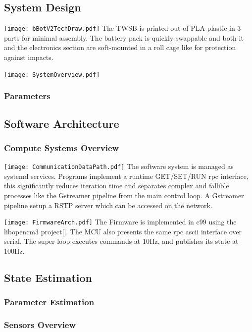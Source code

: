     \subsection{System Design}
        \texttt{[image: bBotV2TechDraw.pdf]}
        The TWSB is printed out of PLA plastic in 3 parts for minimal assembly.
        The battery pack is quickly swappable and both it and the electronics section 
        are soft-mounted in a roll cage like for protection against impacts. 
        
        \texttt{[image: SystemOverview.pdf]}

        \subsubsection{Parameters}

        \subsection{Software Architecture}
        \subsubsection{Compute Systems Overview }
        \texttt{[image: CommunicationDataPath.pdf]}  
            The software system is managed as systemd services.
            Programs implement a runtime GET/SET/RUN rpc interface,
            this significantly reduces iteration time and separates 
            complex and fallible processes like the Gstreamer pipeline 
            from the main control loop. 
            A Gstreamer pipeline setup a RSTP server which can be accessed on the network.

        \texttt{[image: FirmwareArch.pdf]}
            The Firmware is implemented in c99 using the libopencm3 project[].
            The MCU also presents the same rpc ascii interface over serial. 
            The super-loop executes commands at 10Hz, 
            and publishes its state at 100Hz.


        

    \subsection{State Estimation}
        \subsubsection{Parameter Estimation}
        \subsubsection{Sensors Overview}
